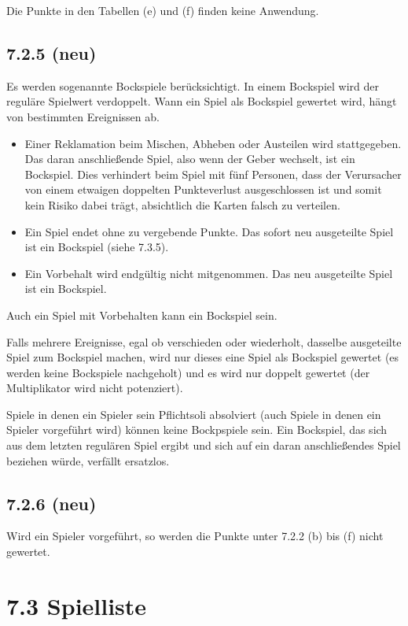 Die Punkte in den Tabellen (e) und (f) finden keine Anwendung.

\subsection*{7.2.5 (neu)}

Es werden sogenannte Bockspiele berücksichtigt. In einem Bockspiel wird
der reguläre Spielwert verdoppelt. Wann ein Spiel als Bockspiel
gewertet wird, hängt von bestimmten Ereignissen ab.

\begin{itemize}
    \item Einer Reklamation beim Mischen, Abheben oder Austeilen wird
        stattgegeben. Das daran anschließende Spiel, also wenn der Geber
        wechselt, ist ein Bockspiel. Dies verhindert beim Spiel mit fünf
        Personen, dass der Verursacher von einem etwaigen doppelten
        Punkteverlust ausgeschlossen ist und somit kein Risiko dabei
        trägt, absichtlich die Karten falsch zu verteilen.
    \item Ein Spiel endet ohne zu vergebende Punkte. Das sofort neu
        ausgeteilte Spiel ist ein Bockspiel (siehe 7.3.5).
    \item Ein Vorbehalt  wird endgültig nicht mitgenommen. Das
        neu ausgeteilte Spiel ist ein Bockspiel.
\end{itemize}

Auch ein Spiel mit Vorbehalten kann ein Bockspiel sein.

Falls mehrere Ereignisse, egal ob verschieden oder wiederholt, dasselbe
ausgeteilte Spiel zum Bockspiel machen, wird nur dieses eine Spiel als
Bockspiel gewertet (es werden keine Bockspiele nachgeholt) und es wird
nur doppelt gewertet (der Multiplikator wird nicht potenziert).

Spiele in denen ein Spieler sein Pflichtsoli absolviert (auch Spiele in denen
ein Spieler vorgeführt wird) können keine Bockpspiele sein. Ein Bockspiel, das
sich aus dem letzten regulären Spiel ergibt und sich auf ein daran
anschließendes Spiel beziehen würde, verfällt ersatzlos.

\subsection*{7.2.6 (neu)}

Wird ein Spieler vorgeführt, so werden die Punkte unter 7.2.2 (b) bis
(f) nicht gewertet.

\section*{7.3 Spielliste}

